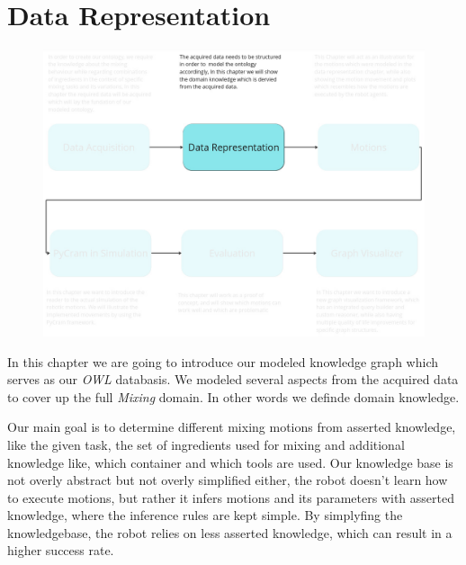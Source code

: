\chapter{Data Representation}
\label{chap:Data_representation}
\begin{figure}[H]
    \includegraphics[scale=0.3]{Graphics/overview_2.jpg}
\end{figure}
In this chapter we are going to introduce our modeled knowledge graph which serves as our \textit{OWL} databasis. We modeled several aspects from the acquired data to cover up the full \textit{Mixing} domain. In other words we definde domain knowledge.

Our main goal is to determine different mixing motions from asserted knowledge, like the given task, the set of ingredients used for mixing and additional knowledge like, which container and which tools are used.
Our knowledge base is not overly abstract but not overly simplified either, the robot doesn't learn how to execute motions, but rather it infers motions and its parameters with asserted knowledge, where the inference rules are kept simple.
By simplyfing the knowledgebase, the robot relies on less asserted knowledge, which can result in a higher success rate.

